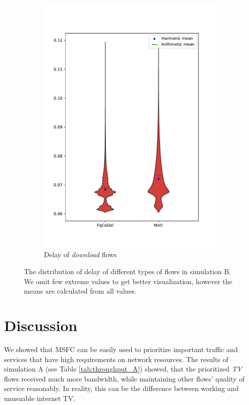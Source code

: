 \begin{figure}
\begin{subfigure}[b]{0.475\textwidth}
		\includegraphics[width=\textwidth]{drawings/type5-delay-down_B}
		\caption[]%
		{{\small Delay of \emph{download} flows}}    
		\label{fig:delay_download_B}
	\end{subfigure}
	\caption[]
	{\small The distribution of delay of different types of flows in simulation B. We omit few extreme values to get better visualization, however the means are calculated from all values.} 
	\label{fig:delay_flows_B}
\end{figure}



\section{Discussion}

We showed that MSFC can be easily used to prioritize important traffic and services that have high requirements on network resources. The results of simulation A (see Table \ref{tab:throughput_A}) showed, that the prioritized \emph{TV} flows received much more bandwidth, while maintaining other flows' quality of service reasonably. In reality, this can be the difference between working and unusuable internet TV. 

